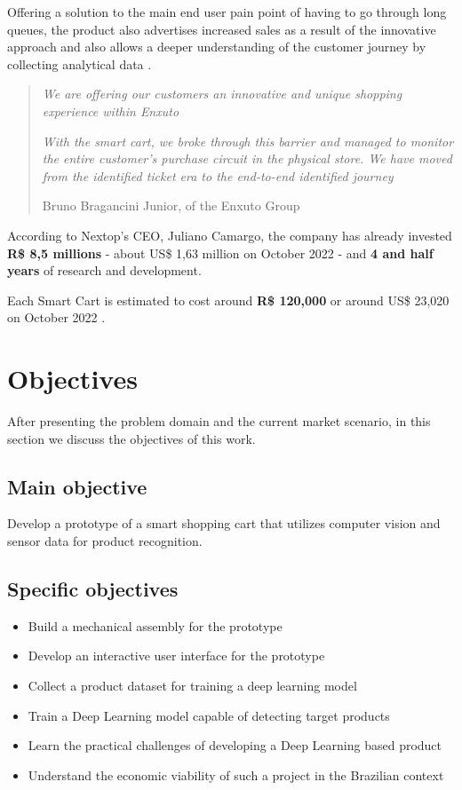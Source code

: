 Offering a solution to the main end user pain point of having to go through
long queues, the product also advertises increased sales as a result of the
innovative approach and also allows a deeper understanding of the customer
journey by collecting analytical data \cite{Paraiba2022}.

\begin{quote}
\textit{We are offering our customers an innovative and unique shopping experience within Enxuto}

\textit{With the smart cart, we broke through this barrier and managed to monitor the
entire customer's purchase circuit in the physical store. We have moved
from the identified ticket era to the end-to-end identified journey}

    Bruno Bragancini Junior,  of the Enxuto Group \cite{Paraiba2022}
\end{quote}

According to Nextop's CEO, Juliano Camargo, the company has already invested \textbf{R\$ 8,5 millions} - about US\$ 1,63 million on October 2022 - and \textbf{4 and half years}
of research and development.

Each Smart Cart is estimated to cost around \textbf{R\$ 120,000} or around US\$ 23,020 on October 2022 \cite{Paraiba2022}.

\section{Objectives}

After presenting the problem domain and the current market scenario, in this section we discuss the 
objectives of this work.

\subsection{Main objective}
Develop a prototype of a smart shopping cart that utilizes computer
vision and sensor data for product recognition.

\subsection{Specific objectives}
\begin{itemize}
    \item Build a mechanical assembly for the prototype
    \item Develop an interactive user interface for the prototype
    \item Collect a product dataset for training a deep learning model
    \item Train a Deep Learning model capable of detecting target products
	\item Learn the practical challenges of developing a Deep Learning based product
    \item Understand the economic viability of such a project in the Brazilian context
\end{itemize}
